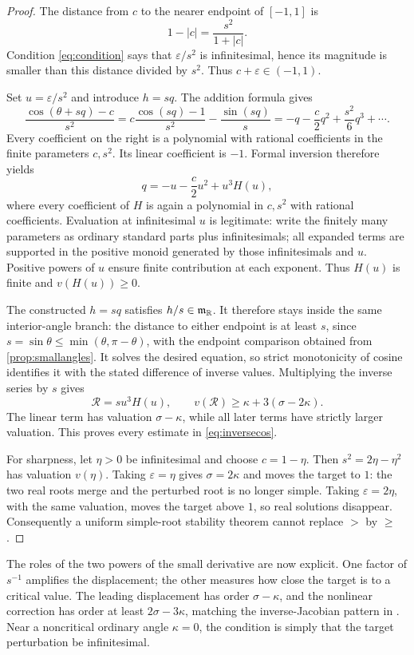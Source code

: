 \documentclass[11pt,letterpaper]{article}
\theoremstyle{definition}
\theoremstyle{remark}
\newcommand{\R}{\mathbb R}\newcommand{\C}{\mathbb C}
\numberwithin{equation}{section}
\begin{document}
\begin{proof}
The distance from $c$ to the nearer endpoint of $[-1,1]$ is
\[
 1-|c|=\frac{s^2}{1+|c|}.
\]
Condition \eqref{eq:condition} says that $\varepsilon/s^2$ is infinitesimal, hence its magnitude is smaller than this distance divided by $s^2$. Thus $c+\varepsilon\in(-1,1)$.

Set $u=\varepsilon/s^2$ and introduce $h=sq$. The addition formula gives
\begin{equation}\label{eq:normalizedinverse}
 \frac{\cos(\theta+sq)-c}{s^2}
 =c\frac{\cos(sq)-1}{s^2}-\frac{\sin(sq)}s
 =-q-\frac c2q^2+\frac{s^2}{6}q^3+\cdots.
\end{equation}
Every coefficient on the right is a polynomial with rational coefficients in the finite parameters $c,s^2$. Its linear coefficient is $-1$. Formal inversion therefore yields
\[
 q=-u-\frac c2u^2+u^3H(u),
\]
where every coefficient of $H$ is again a polynomial in $c,s^2$ with rational coefficients. Evaluation at infinitesimal $u$ is legitimate: write the finitely many parameters as ordinary standard parts plus infinitesimals; all expanded terms are supported in the positive monoid generated by those infinitesimals and $u$. Positive powers of $u$ ensure finite contribution at each exponent. Thus $H(u)$ is finite and $v(H(u))\ge0$.

The constructed $h=sq$ satisfies $h/s\in\mm_{\R}$. It therefore stays inside the same interior-angle branch: the distance to either endpoint is at least $s$, since $s=\sin\theta\le\min(\theta,\pi-\theta)$, with the endpoint comparison obtained from \cref{prop:smallangles}. It solves the desired equation, so strict monotonicity of cosine identifies it with the stated difference of inverse values. Multiplying the inverse series by $s$ gives
\[
 \mathcal R=s u^3H(u),\qquad v(\mathcal R)\ge\kappa+3(\sigma-2\kappa).
\]
The linear term has valuation $\sigma-\kappa$, while all later terms have strictly larger valuation. This proves every estimate in \eqref{eq:inversecos}.

For sharpness, let $\eta>0$ be infinitesimal and choose $c=1-\eta$. Then $s^2=2\eta-\eta^2$ has valuation $v(\eta)$. Taking $\varepsilon=\eta$ gives $\sigma=2\kappa$ and moves the target to $1$: the two real roots merge and the perturbed root is no longer simple. Taking $\varepsilon=2\eta$, with the same valuation, moves the target above $1$, so real solutions disappear. Consequently a uniform simple-root stability theorem cannot replace $>$ by $\ge$.
\end{proof}
The roles of the two powers of the small derivative are now explicit. One factor of $s^{-1}$ amplifies the displacement; the other measures how close the target is to a critical value. The leading displacement has order $\sigma-\kappa$, and the nonlinear correction has order at least $2\sigma-3\kappa$, matching the inverse-Jacobian pattern in \cite{InputIntersections}. Near a noncritical ordinary angle $\kappa=0$, the condition is simply that the target perturbation be infinitesimal.
\end{document}
